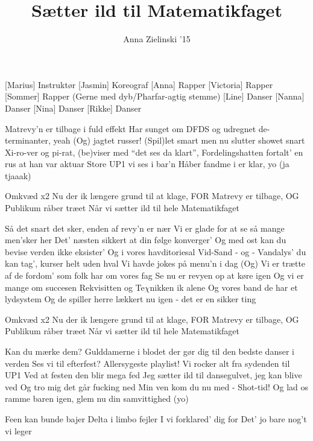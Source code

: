 \documentclass[a4paper,11pt]{article}
\title{Sætter ild til Matematikfaget}
\author{Anna Zielinski '15}
\begin{document}
\maketitle

\begin{roles}
[Marius] Instruktør
[Jasmin] Koreograf
[Anna] Rapper
[Victoria] Rapper
[Sommer] Rapper (Gerne med dyb/Pharfar-agtig stemme)
[Line] Danser
[Nanna] Danser
[Nina] Danser
[Rikke] Danser
\end{roles}

\begin{song}
 Matrevy'n er tilbage i fuld effekt
Har sunget om DFDS og udregnet de-terminanter, yeah
 (Og) jagtet russer!
 (Spil)let smart men nu slutter showet snart
Xi-ro-ver og pi-rat, (be)viser med “det ses da klart”,
Fordelingshatten fortalt’ en rus at han var aktuar
Store UP1 vi ses i bar’n
Håber fandme i er klar, yo (ja tjaaak)

Omkvæd x2
 Nu der ik længere grund til at klage,
 FOR
Matrevy er tilbage,
OG
Publikum råber træet
Når vi sætter ild til hele Matematikfaget

 Så det snart det sker, enden af revy’n er nær
Vi er glade for at se så mange men’sker her
Det’ næsten sikkert at din følge konverger’
Og med ost kan du bevise verden ikke eksister’
Og i vores havditoriesal
Vid-Sand - og - Vandalys’ du kan tag’, kurser helt uden hval
Vi havde jokes på menu’n i dag
(Og) Vi er trætte af de fordom’ som  folk har om vores fag
Se nu er revyen op at køre igen
Og vi er mange om succesen
Rekvisitten og Te$\chi$nikken ik alene
Og vores band de har et lydsystem
Og de spiller herre lækkert nu igen - det er en sikker ting

Omkvæd x2
 Nu der ik længere grund til at klage,
 FOR
Matrevy er tilbage,
OG
Publikum råber træet
Når vi sætter ild til hele Matematikfaget

 Kan du mærke dem?
Gulddamerne i blodet der gør dig til den bedste danser i verden
Ses vi til efterfest? Allersygeste playlist!
Vi rocker alt fra sydenden til UP1
Ved at festen den blir mega fed
Jeg sætter ild til dansegulvet, jeg kan blive ved
Og tro mig det går fucking ned
Min ven kom du nu med  - Shot-tid!
Og lad os ramme baren igen, glem nu din samvittighed (yo)

 Feen kan bunde bajer
Delta i limbo fejler
I vi forklared’ dig for
Det’ jo bare nog’t vi leger


\end{song}
\end{document}
